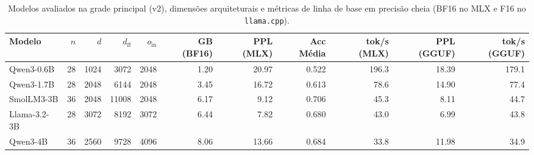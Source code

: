 \begin{table}[htbp]
\centering
\caption{Modelos avaliados na grade principal (v2), dimensões arquiteturais e métricas de linha de base em precisão cheia (BF16 no MLX e F16 no \texttt{llama.cpp}).}
\label{tab:grade_modelos}
\small
\begin{tabular}{lrrrrrrrrrr}
\toprule
Modelo & $n$ & $d$ & $d_{\text{ff}}$ & $o_{\text{in}}$ & GB (BF16) & PPL (MLX) & Acc Média & tok/s (MLX) & PPL (GGUF) & tok/s (GGUF) \\
\midrule
Qwen3-0.6B & 28 & 1024 & 3072 & 2048 & 1.20 & 20.97 & 0.522 & 196.3 & 18.39 & 179.1 \\
Qwen3-1.7B & 28 & 2048 & 6144 & 2048 & 3.45 & 16.72 & 0.613 & 78.6 & 14.90 & 77.4 \\
SmolLM3-3B & 36 & 2048 & 11008 & 2048 & 6.17 & 9.12 & 0.706 & 45.3 & 8.11 & 44.7 \\
Llama-3.2-3B & 28 & 3072 & 8192 & 3072 & 6.44 & 7.82 & 0.680 & 43.0 & 6.99 & 43.8 \\
Qwen3-4B & 36 & 2560 & 9728 & 4096 & 8.06 & 13.66 & 0.684 & 33.8 & 11.98 & 34.9 \\
\bottomrule
\end{tabular}
\end{table}
